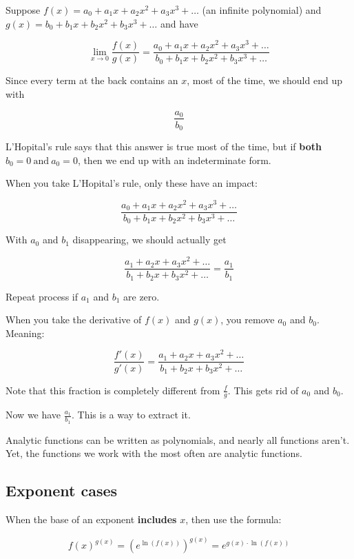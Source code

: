 \documentclass[
]{article}
\begin{document}
Suppose $f(x) = a_{0} + a_{1}x + a_{2}x^{2} + a_{3}x^{3} + \ldots$ (an
infinite polynomial) and
$g(x) = b_{0} + b_{1}x + b_{2}x^{2} + b_{3}x^{3} + \ldots$ and have

$$\lim_{x \rightarrow 0}\frac{f(x)}{g(x)} = \frac{a_{0} + a_{1}x + a_{2}x^{2} + a_{3}x^{3} + \ldots}{b_{0} + b_{1}x + b_{2}x^{2} + b_{3}x^{3} + \ldots}$$

Since every term at the back contains an $x$, most of the time, we
should end up with

$$\frac{a_{0}}{b_{0}}$$

L'Hopital's rule says that this answer is true most of the time, but if
\textbf{both} $b_{0} = 0\ \text{and}\ a_{0} = 0$, then we end up with
an indeterminate form.

When you take L'Hopital's rule, only these have an impact:

$$\frac{a_{0} + a_{1}x + a_{2}x^{2} + a_{3}x^{3} + \ldots}{b_{0} + b_{1}x + b_{2}x^{2} + b_{3}x^{3} + \ldots}$$

With $a_{0}$ and $b_{1}$ disappearing, we should actually get

$$\frac{a_{1} + a_{2}x + a_{3}x^{2} + \ldots}{b_{1} + b_{2}x + b_{3}x^{2} + \ldots} = \frac{a_{1}}{b_{1}}$$

Repeat process if $a_{1}$ and $b_{1}$ are zero.

When you take the derivative of $f(x)$ and $g(x)$, you remove
$a_{0}$ and $b_{0}$. Meaning:

$$\frac{f'(x)}{g'(x)} = \frac{a_{1} + a_{2}x + a_{3}x^{2} + \ldots}{b_{1} + b_{2}x + b_{3}x^{2} + \ldots}$$

Note that this fraction is completely different from $\frac{f}{g}$.
This gets rid of $a_{0}$ and $b_{0}$.

Now we have $\frac{a_{1}}{b_{1}}$. This is a way to extract it.

Analytic functions can be written as polynomials, and nearly all
functions aren't. Yet, the functions we work with the most often are
analytic functions.


\subsection{Exponent cases}

When the base of an exponent \textbf{includes} $x$, then use the
formula:

$$f(x)^{g(x)} = \left( e^{\ln\left( f(x) \right)} \right)^{g(x)} = e^{g(x) \cdot \ln\left( f(x) \right)}$$
\end{document}
